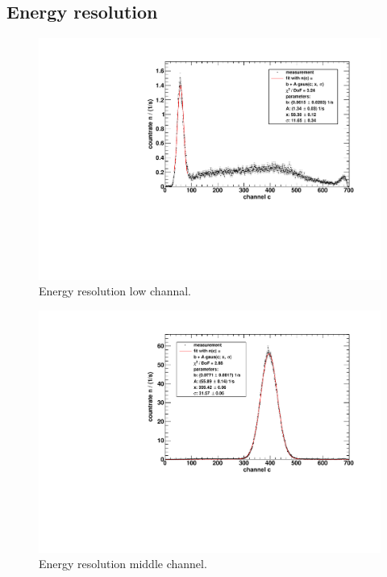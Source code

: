 \subsection{Energy resolution}
\begin{figure}[H]
\begin{center}
  \includegraphics[width=\textwidth]{../img/energieaufloesung_059.pdf}
  \caption{Energy resolution low channal.}
  \label{img:eres:059}
\end{center}
\end{figure}

\begin{figure}[H]
\begin{center}
  \includegraphics[width=\textwidth]{../img/energieaufloesung_400.pdf}
  \caption{Energy resolution middle channel.}
  \label{img:eres:400}
\end{center}
\end{figure}

